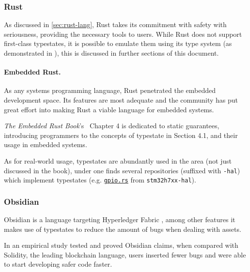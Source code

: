 \subsubsection*{Rust}

As discussed in \autoref{sec:rust-lang}, Rust takes its commitment with safety with seriousness,
providing the necessary tools to users.
While Rust does not support first-class typestates,
it is possible to emulate them using its type system (as demonstrated in \autocite{Duarte2020}),
this is discussed in further sections of this document.

\paragraph{Embedded Rust.} As any systems programming language, Rust penetrated the embedded development space.
Its features are most adequate and the community has put great effort into making Rust a viable language for embedded systems.

\emph{The Embedded Rust Book}'s~\autocite{Rust2021} Chapter 4 is dedicated to static guarantees,
introducing programmers to the concepts of typestate in Section 4.1, and their usage in embedded systems.

As for real-world usage, typestates are abundantly used in the area (not just discussed in the book),
under \autocite{Stm32} one finds several repositories (suffixed with \texttt{-hal})
which implement typestates
(e.g. \href{https://github.com/stm32-rs/stm32h7xx-hal/blob/master/src/gpio.rs#L51-L128}{\texttt{gpio.rs}}
from \texttt{stm32h7xx-hal}).

\subsubsection*{Obsidian}

Obsidian is a language targeting Hyperledger Fabric \autocite{Fabric2021},
among other features it makes use of typestates to reduce the amount of bugs when dealing with assets.

In \autocite{Coblenz2020} an empirical study tested and proved Obsidian claims,
when compared with Solidity, the leading blockchain language,
users inserted fewer bugs and were able to start developing safer code faster.

